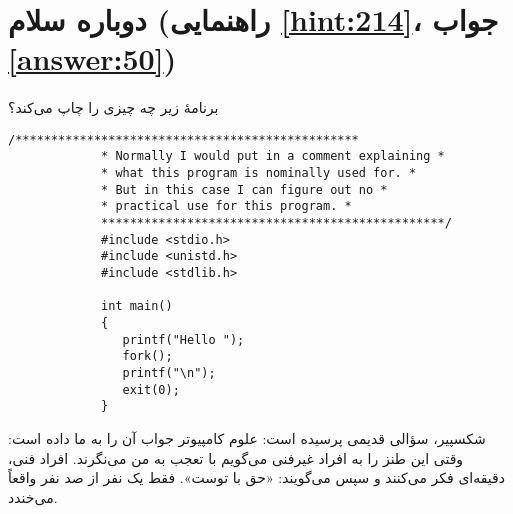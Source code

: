 \section[دوباره سلام]{دوباره سلام \protect{} (راهنمایی \ref{hint:214}، جواب \ref{answer:50})}
\paragraph{}\label{prog:97}
برنامهٔ زیر چه چیزی را چاپ می‌کند؟

\begin{LTR}
        \begin{lstlisting}[style=C++Style]
             /************************************************
             * Normally I would put in a comment explaining *
             * what this program is nominally used for. *
             * But in this case I can figure out no *
             * practical use for this program. *
             ************************************************/
             #include <stdio.h>
             #include <unistd.h>
             #include <stdlib.h>

             int main()
             {
             	printf("Hello ");
             	fork();
             	printf("\n");
             	exit(0);
             }
        \end{lstlisting}
\end{LTR}

\begin{tcolorbox}
    شکسپیر، سؤالی قدیمی پرسیده است:  علوم کامپیوتر جواب آن را به ما داده است:
    \LTR
    \RTL
    وقتی این طنز را به افراد غیرفنی می‌گویم با تعجب به من می‌نگرند. افراد فنی، دقیقه‌ای فکر می‌کنند و سپس می‌گویند: «حق با توست». فقط یک نفر از صد نفر واقعاً می‌خندد.
\end{tcolorbox}